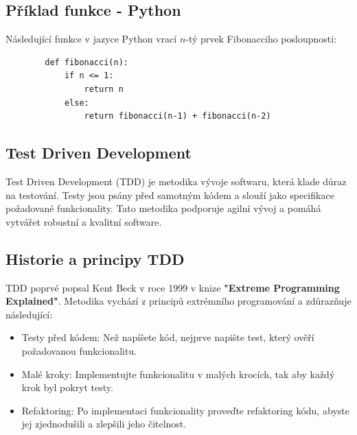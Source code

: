 \documentclass{article}
\begin{document}
\begin{Čistý kód - Funkce}
        \subsection{Příklad funkce - Python}\label{subsec:priklad-funkce---python}
        Následující funkce v jazyce Python vrací \(n\)-tý prvek Fibonacciho posloupnosti:
        \begin{verbatim}
        def fibonacci(n):
            if n <= 1:
                return n
            else:
                return fibonacci(n-1) + fibonacci(n-2)
        \end{verbatim}
    \end{Čistý kód - Funkce}

    \break

    \begin{Test Driven Development}
        \section{Test Driven Development}\label{sec:test-driven-development}

        Test Driven Development (TDD) je metodika vývoje softwaru, která klade důraz na testování.
        Testy jsou psány před samotným kódem a slouží jako specifikace požadované funkcionality.
        Tato metodika podporuje agilní vývoj a pomáhá vytvářet robustní a kvalitní software.

        \subsection{Historie a principy TDD}\label{subsec:historie-a-principy-tdd}

        TDD poprvé popsal Kent Beck v roce 1999 v knize \textbf{"Extreme Programming Explained"}.
        Metodika vychází z principů extrémního programování a zdůrazňuje následující:

        \begin{itemize}
            \item Testy před kódem: Než napíšete kód, nejprve napište test, který ověří požadovanou funkcionalitu.
            \item Malé kroky: Implementujte funkcionalitu v malých krocích, tak aby každý krok byl pokryt testy.
            \item Refaktoring: Po implementaci funkcionality proveďte refaktoring kódu, abyste jej zjednodušili a zlepšili jeho čitelnost.
        \end{itemize}


\end{Test Driven Development}
\end{document}
